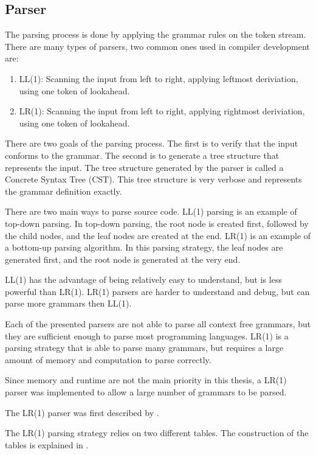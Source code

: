 
\subsection{Parser}

The parsing process is done by applying the grammar rules on the token stream. 
There are many types of parsers, two common ones used in compiler development are:

\begin{enumerate}
\item LL(1): Scanning the input from left to right, applying leftmost deriviation, using one token of lookahead.
\item LR(1): Scanning the input from left to right, applying rightmost deriviation, using one token of lookahead.
\end{enumerate}

There are two goals of the parsing process. 
The first is to verify that the input conforms to the grammar. 
The second is to generate a tree structure that represents the input. 
The tree structure generated by the parser is called a Concrete Syntax Tree (CST). 
This tree structure is very verbose and represents the grammar definition exactly.

There are two main ways to parse source code. 
LL(1) parsing is an example of top-down parsing.
In top-down parsing, the root node is created first, followed by the child nodes, and the leaf nodes are created at the end.  
LR(1) is an example of a bottom-up parsing algorithm.
In this parsing strategy, the leaf nodes are generated first, and the root node is generated at the very end. 


LL(1) has the advantage of being relatively easy to understand, but is less powerful than LR(1). 
LR(1) parsers are harder to understand and debug, but can parse more grammars then LL(1).

Each of the presented parsers are not able to parse all context free grammars, but they are sufficient enough to parse most programming languages. 
LR(1) is a parsing strategy that is able to parse many grammars, but requires a large amount of memory and computation to parse correctly.

Since memory and runtime are not the main priority in this thesis, a LR(1) parser was implemented to allow a large number of grammars to be parsed.

The LR(1) parser was first described by \cite{KNUTH1965607}.

The LR(1) parsing strategy relies on two different tables. The construction of the tables is explained in \cite[pages 259-266]{AhoLSU2006}.

